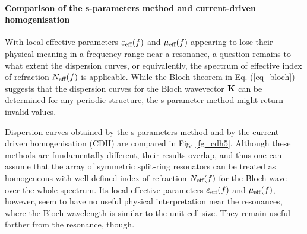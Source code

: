 
\paragraph{Comparison of the s-parameters method and current-driven homogenisation}%
With local effective parameters $\varepsilon_{\text{eff} }(f)$ and $\mu_{\text{eff} }(f)$ appearing to lose their physical meaning in a frequency range near a resonance, a question remains to what extent the dispersion curves, or equivalently, the spectrum of effective index of refraction $N_{\text{eff} }(f)$ is applicable. While the Bloch theorem in Eq. (\ref{eq_bloch}) suggests that the dispersion curves for the Bloch wavevector ${\mathbf{K}}$ can be determined for any periodic structure, the s-parameter method might return invalid values.

Dispersion curves obtained by the s-parameters method and by the current-driven homogenisation (CDH) are compared in Fig. \ref{fg_cdh5}. Although these methods are fundamentally different, their results overlap, and thus one can assume that the array of symmetric split-ring resonators can be treated as homogeneous with well-defined index of refraction $N_{\text{eff} }(f)$ for the Bloch wave over the whole spectrum. Its local effective parameters $\varepsilon_{\text{eff} }(f)$ and $\mu_{\text{eff} }(f)$, however, seem to have no useful physical interpretation near the resonances, where the Bloch wavelength is similar to the unit cell size. They remain useful farther from the resonance, though. %

